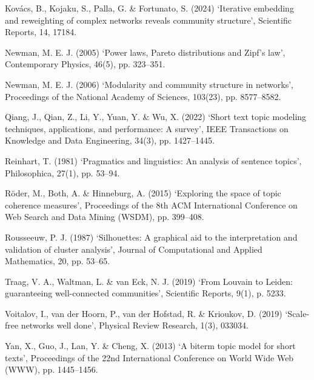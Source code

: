 \documentclass[11pt]{article}
\begin{document}
Kov\'{a}cs, B., Kojaku, S., Palla, G. \& Fortunato, S. (2024) `Iterative embedding and reweighting of complex networks reveals community structure', Scientific Reports, 14, 17184.

Newman, M. E. J. (2005) `Power laws, Pareto distributions and Zipf's law', Contemporary Physics, 46(5), pp. 323--351.

Newman, M. E. J. (2006) `Modularity and community structure in networks', Proceedings of the National Academy of Sciences, 103(23), pp. 8577--8582.

Qiang, J., Qian, Z., Li, Y., Yuan, Y. \& Wu, X. (2022) `Short text topic modeling techniques, applications, and performance: A survey', IEEE Transactions on Knowledge and Data Engineering, 34(3), pp. 1427--1445.

Reinhart, T. (1981) `Pragmatics and linguistics: An analysis of sentence topics', Philosophica, 27(1), pp. 53--94.

R\"{o}der, M., Both, A. \& Hinneburg, A. (2015) `Exploring the space of topic coherence measures', Proceedings of the 8th ACM International Conference on Web Search and Data Mining (WSDM), pp. 399--408.

Rousseeuw, P. J. (1987) `Silhouettes: A graphical aid to the interpretation and validation of cluster analysis', Journal of Computational and Applied Mathematics, 20, pp. 53--65.

Traag, V. A., Waltman, L. \& van Eck, N. J. (2019) `From Louvain to Leiden: guaranteeing well-connected communities', Scientific Reports, 9(1), p. 5233.

Voitalov, I., van der Hoorn, P., van der Hofstad, R. \& Krioukov, D. (2019) `Scale-free networks well done', Physical Review Research, 1(3), 033034.

Yan, X., Guo, J., Lan, Y. \& Cheng, X. (2013) `A biterm topic model for short texts', Proceedings of the 22nd International Conference on World Wide Web (WWW), pp. 1445--1456.
\end{document}
